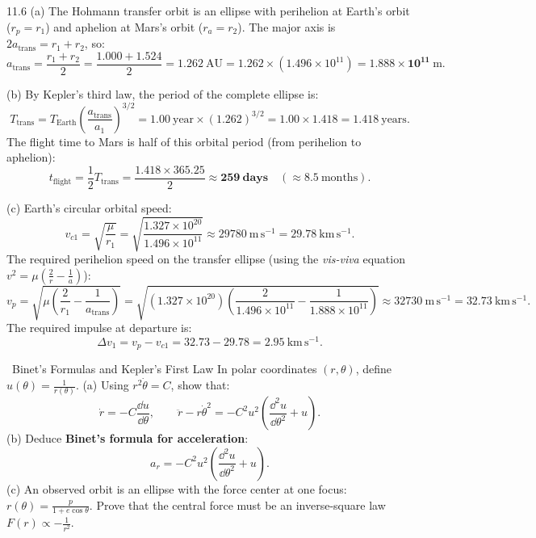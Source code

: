 \begin{tabletworkspace}[6.5cm]
\end{tabletworkspace}

\begin{solution}{11.6}
(a) The Hohmann transfer orbit is an ellipse with perihelion at Earth's orbit ($r_p = r_1$) and aphelion at Mars's orbit ($r_a = r_2$).
The major axis is $2a_{\text{trans}} = r_1 + r_2$, so:
\[
a_{\text{trans}} = \frac{r_1 + r_2}{2} = \frac{1.000 + 1.524}{2} = \mathbf{1.262\ \mathrm{AU}} = 1.262\times(1.496\times 10^{11}) = \mathbf{1.888\times 10^{11}\ \mathrm{m}.}
\]

(b) By Kepler's third law, the period of the complete ellipse is:
\[
T_{\text{trans}} = T_{\text{Earth}} \left(\frac{a_{\text{trans}}}{a_1}\right)^{3/2} = 1.00\ \text{year}\times(1.262)^{3/2} = 1.00\times 1.418 = 1.418\ \text{years}.
\]
The flight time to Mars is half of this orbital period (from perihelion to aphelion):
\[
t_{\text{flight}} = \frac{1}{2}T_{\text{trans}} = \frac{1.418\times 365.25}{2} \approx \mathbf{259\ \text{days}} \quad (\approx 8.5\ \text{months}).
\]

(c) Earth's circular orbital speed:
\[
v_{c1} = \sqrt{\frac{\mu}{r_1}} = \sqrt{\frac{1.327\times 10^{20}}{1.496\times 10^{11}}} \approx 29780\ \mathrm{m\,s^{-1}} = 29.78\ \mathrm{km\,s^{-1}}.
\]
The required perihelion speed on the transfer ellipse (using the \emph{vis-viva} equation $v^2 = \mu\left(\frac{2}{r} - \frac{1}{a}\right)$):
\[
v_{p} = \sqrt{\mu\left(\frac{2}{r_1} - \frac{1}{a_{\text{trans}}}\right)} = \sqrt{(1.327\times 10^{20})\left(\frac{2}{1.496\times 10^{11}} - \frac{1}{1.888\times 10^{11}}\right)} \approx 32730\ \mathrm{m\,s^{-1}} = 32.73\ \mathrm{km\,s^{-1}}.
\]
The required impulse at departure is:
\[
\Delta v_1 = v_p - v_{c1} = 32.73 - 29.78 = \mathbf{2.95\ \mathrm{km\,s^{-1}}.}
\]
\end{solution}

\begin{exercise}{\mastery\ Binet's Formulas and Kepler's First Law}
In polar coordinates $(r, \theta)$, define $u(\theta) = \frac{1}{r(\theta)}$.
(a) Using $r^2\dot{\theta} = C$, show that:
\[
\dot{r} = -C\frac{\dd u}{\dd\theta},\qquad \ddot{r} - r\dot{\theta}^2 = -C^2 u^2\left(\frac{\dd^2 u}{\dd\theta^2} + u\right).
\]
(b) Deduce \textbf{Binet's formula for acceleration}:
\[
a_r = -C^2 u^2\left(\frac{\dd^2 u}{\dd\theta^2} + u\right).
\]
(c) An observed orbit is an ellipse with the force center at one focus: $r(\theta) = \frac{p}{1 + e\cos\theta}$. Prove that the central force must be an inverse-square law $F(r) \propto -\frac{1}{r^2}$.
\end{exercise}

